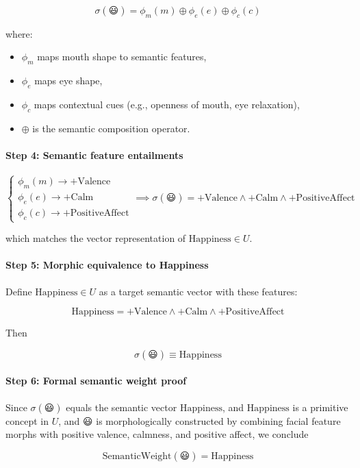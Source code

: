 \documentclass{article}
\begin{document}
\[
\sigma(\text{😃}) = \phi_m(m) \oplus \phi_e(e) \oplus \phi_c(c)
\]

where:  
\begin{itemize}
    \item $\phi_m$ maps mouth shape to semantic features,
    \item $\phi_e$ maps eye shape,
    \item $\phi_c$ maps contextual cues (e.g., openness of mouth, eye relaxation),
    \item $\oplus$ is the semantic composition operator.
\end{itemize}

\paragraph{Step 4: Semantic feature entailments}

\[
\begin{cases}
\phi_m(m) \to +\mathrm{Valence} \\
\phi_e(e) \to +\mathrm{Calm} \\
\phi_c(c) \to +\mathrm{PositiveAffect}
\end{cases}
\implies
\sigma(\text{😃}) = +\mathrm{Valence} \wedge +\mathrm{Calm} \wedge +\mathrm{PositiveAffect}
\]

which matches the vector representation of $\mathrm{Happiness} \in U$.

\paragraph{Step 5: Morphic equivalence to Happiness}

Define $\mathrm{Happiness} \in U$ as a target semantic vector with these features:

\[
\mathrm{Happiness} = +\mathrm{Valence} \wedge +\mathrm{Calm} \wedge +\mathrm{PositiveAffect}
\]

Then

\[
\sigma(\text{😃}) \equiv \mathrm{Happiness}
\]

\paragraph{Step 6: Formal semantic weight proof}

Since $\sigma(\text{😃})$ equals the semantic vector $\mathrm{Happiness}$, and $\mathrm{Happiness}$ is a primitive concept in $U$,  
and $\text{😃}$ is morphologically constructed by combining facial feature morphs with positive valence, calmness, and positive affect,  
we conclude

\[
\boxed{
\mathrm{SemanticWeight}(\text{😃}) = \mathrm{Happiness}
}
\]
\end{document}
